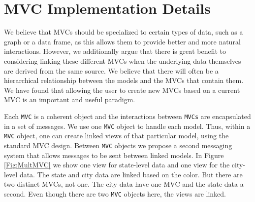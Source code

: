 \documentclass[11pt]{article}
\newcommand{\Robject}[1]{{\texttt{#1}}}
\begin{document}
\section{MVC Implementation Details}
\label{Sec:OneMVC}

We believe that MVCs should be specialized to certain types of data, such 
as a graph or a data frame, as this allows them to provide
better and more natural interactions.  However, we additionally argue
that there is great benefit to considering linking these different
MVCs when the underlying data themselves are derived from the same source.
We believe that there will often be a hierarchical relationship
between the models and the MVCs that contain them.  We have found
that allowing the user to create new MVCs based on a current MVC is an
important and useful paradigm.

Each \Robject{MVC} is a coherent object and the interactions between
\Robject{MVCs} are encapsulated in a set of messages.  We use one
\Robject{MVC} object to handle each model.  Thus, within a
\Robject{MVC} object, one can create linked views of that particular
model, using the standard MVC design.  Between \Robject{MVC}
objects we propose a second messaging system that allows messages to
be sent between linked models.  In Figure \ref{Fig:MultMVC} we show one 
view for state-level data and one view for the city-level data.  The state 
and city data are linked based on the color.  But there are two distinct 
MVCs, not one.  The city data have one MVC and the state data a second.  
Even though there are two \Robject{MVC} objects here, the views are linked.
\end{document}
